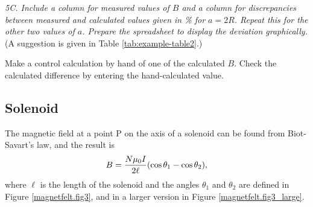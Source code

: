 \documentclass[../Elmag-labhefte-2020.tex]{subfiles}
\begin{document}
\emph{5C. Include a column for measured values   of $B$ and a column for discrepancies between measured and calculated values   given in \si{\percent} for $a = 2R$. Repeat this for the other two values   of $a$. Prepare the spreadsheet to display the deviation graphically.} (A suggestion is given in Table \ref{tab:example-table2}.)

Make a control calculation by hand of one of the calculated $B$. Check the calculated difference by entering the hand-calculated value.

\subsection{Solenoid \label{ch.magnetfelt.solenoide}}

The magnetic field at a point P on the axis of a solenoid can be found from Biot-Savart's law, and the result is
\begin{equation}
    B = \frac{N \mu_0 I} {2 \ell} \qty(\cos\theta_1 - \cos\theta_2),
    \label{eq:solenoide}
\end{equation}
where $\ell$ is the length of the solenoid and the angles $\theta_1$ and $\theta_2$ are defined in Figure \ref{magnetfelt.fig3}, and in a larger version in Figure \ref{magnetfelt.fig3_large}.
%
\end{document}

